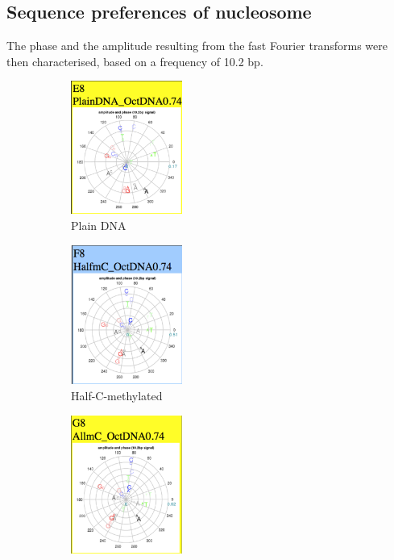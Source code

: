 \documentclass[parskip=full, numbers=noenddot]{scrreprt}
\begin{document}
\subsection{Sequence preferences of nucleosome}
\label{ssec:nuseqpref}

The phase and the amplitude resulting from the fast Fourier transforms were then characterised, based on a frequency of 10.2 bp.

\begin{figure}[htpb]
  \centering
  \begin{subfigure}[htpb]{0.4\textwidth}
    \centering
    \includegraphics[width=0.4\textwidth]{emsa_e8_radial}
    \caption{Plain DNA}
    \label{fig:radial_mc_plain}
  \end{subfigure}
  \begin{subfigure}[htpb]{0.4\textwidth}
    \centering
    \includegraphics[width=0.4\textwidth]{emsa_f8_radial}
    \caption{Half-C-methylated}
    \label{fig:radial_mc_halfmc}
  \end{subfigure}
  \begin{subfigure}[htpb]{0.4\textwidth}
    \centering
    \includegraphics[width=0.4\textwidth]{emsa_g8_radial}

\end{subfigure}
\end{figure}
\end{document}
